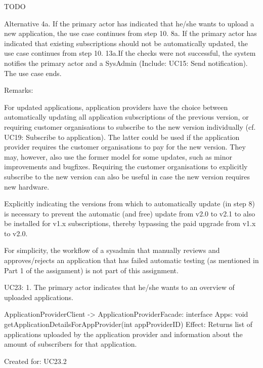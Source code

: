             TODO
            
        Alternative     
            4a. If the primary actor has indicated that he/she wants to upload a new application, the use case
                continues from step 10.
            8a. If the primary actor has indicated that existing subscriptions should not be automatically
                updated, the use case continues from step 10.
            13a.If the checks were not successful, the system notifies the primary actor and a SysAdmin
                (Include: UC15: Send notification). The use case ends.
        
        Remarks:
            { For updated applications, application providers have the choice between automatically updating
              all application subscriptions of the previous version, or requiring customer organisations
              to subscribe to the new version individually (cf. UC19: Subscribe to application). The latter
              could be used if the application provider requires the customer organisations to pay for the
              new version. They may, however, also use the former model for some updates, such as minor
              improvements and bugfixes. Requiring the customer organisations to explicitly subscribe to
              the new version can also be useful in case the new version requires new hardware.
            { Explicitly indicating the versions from which to automatically update (in step 8) is necessary
              to prevent the automatic (and free) update from v2.0 to v2.1 to also be installed for v1.x
              subscriptions, thereby bypassing the paid upgrade from v1.x to v2.0.
            { For simplicity, the workflow of a sysadmin that manually reviews and approves/rejects an
              application that has failed automatic testing (as mentioned in Part 1 of the assignment) is not
              part of this assignment.
    

    UC23:
        1. The primary actor indicates that he/she wants to an overview of uploaded applications.

            ApplicationProviderClient -> ApplicationProviderFacade: interface Apps: 
                                                    void getApplicationDetailsForAppProvider(int appProviderID)
                Effect: Returns list of applications uploaded by the application provider and information about the amount of subscribers    
                        for that application.
                \item Created for: UC23.2

}}}
